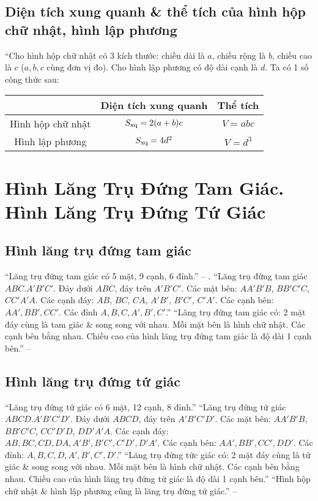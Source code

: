 \documentclass[oneside]{book}
\numberwithin{equation}{section}
\begin{document}
\subsection{Diện tích xung quanh \& thể tích của hình hộp chữ nhật, hình lập phương}
``Cho hình hộp chữ nhật có 3 kích thước: chiều dài là $a$, chiều rộng là $b$, chiều cao là $c$ ($a,b,c$ cùng đơn vị đo). Cho hình lập phương có độ dài cạnh là $d$. Ta có 1 số công thức sau:
\begin{table}[H]
	\centering
	\begin{tabular}{|c|c|c|}
		\hline
		& \textbf{Diện tích xung quanh} & \textbf{Thể tích} \\
		\hline
		Hình hộp chữ nhật & $S_{\rm xq} = 2(a + b)c$ & $V = abc$ \\
		\hline
		Hình lập phương & $S_{\rm xq} = 4d^2$ & $V = d^3$ \\
		\hline
	\end{tabular}
\end{table}

\section{Hình Lăng Trụ Đứng Tam Giác. Hình Lăng Trụ Đứng Tứ Giác}

\subsection{Hình lăng trụ đứng tam giác}
``Lăng trụ đứng tam giác có 5 mặt, 9 cạnh, 6 đỉnh.'' -- \cite[p. 81]{SGK_Toan_7_Canh_Dieu_tap_1}. ``Lăng trụ đứng tam giác $ABC.A'B'C'$. Đáy dưới $ABC$, đáy trên $A'B'C'$. Các mặt bên: $AA'B'B$, $BB'C'C$, $CC'A'A$. Các cạnh đáy: $AB$, $BC$, $CA$, $A'B'$, $B'C'$, $C'A'$. Các cạnh bên: $AA',BB',CC'$. Các đỉnh $A,B,C,A',B',C'$.'' ``Lăng trụ đứng tam giác có: 2 mặt đáy cùng là tam giác \& song song với nhau. Mỗi mặt bên là hình chữ nhật. Các cạnh bên bằng nhau. Chiều cao của hình lăng trụ đứng tam giác là độ dài 1 cạnh bên.'' -- \cite[p. 82]{SGK_Toan_7_Canh_Dieu_tap_1}

\subsection{Hình lăng trụ đứng tứ giác}
``Lăng trụ đứng tứ giác có 6 mặt, 12 cạnh, 8 đỉnh.'' ``Lăng trụ đứng tứ giác $ABCD.A'B'C'D'$. Đáy dưới $ABCD$, đáy trên $A'B'C'D'$. Các mặt bên: $AA'B'B$, $BB'C'C$, $CC'D'D$, $DD'A'A$. Các cạnh đáy: $AB,BC,CD,DA,A'B',B'C',C'D',D'A'$. Các cạnh bên: $AA',BB',CC',DD'$. Các đỉnh: $A,B,C,D,A',B',C',D'$.'' ``Lăng trụ đứng tức giác có: 2 mặt đáy cùng là tứ giác \& song song với nhau. Mỗi mặt bên là hình chữ nhật. Các cạnh bên bằng nhau. Chiều cao của hình lăng trụ đứng tứ giác là độ dài 1 cạnh bên.'' ``Hình hộp chữ nhật \& hình lập phương cũng là lăng trụ đứng tứ giác.'' -- \cite[p. 83]{SGK_Toan_7_Canh_Dieu_tap_1}
\end{document}
